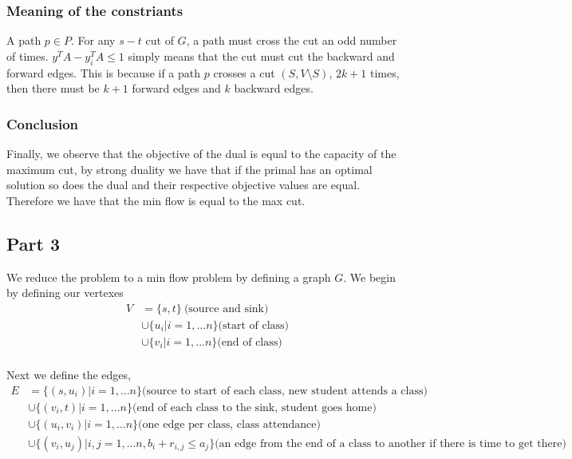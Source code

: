 \documentclass[a4paper]{article}
\begin{document}
 
\subsubsection*{Meaning of the constriants}
A path $p \in P$. For any $s-t$ cut of $G$, a path must cross the cut 
an odd number of times. $y^TA - y_i^TA \leq 1$ simply means that the cut must cut the 
backward and forward edges. This is because if a path $p$ crosses a cut $(S, V\setminus S)$,  $2k+1$ times, then 
there must be $k+1$ forward edges and $k$ backward edges. 

\subsubsection*{Conclusion}

Finally, we observe that the objective of the dual is equal to the capacity of the maximum cut, by 
strong duality we have that if the primal has an optimal solution so does the dual and their respective
objective values are equal. Therefore we have that the min flow is equal to the max cut.

\subsection{Part 3}

We reduce the problem to a min flow problem by defining a graph $G$. We begin by defining our 
vertexes 
\begin{align*}
	V &= \{s, t\}\ \text{(source and sink)} \\ 
	&\cup \{u_i | i=1,...n\} \text{(start of class)}\\
	&\cup \{v_i | i=1,...n\} \text{(end of class)}\\
\end{align*}

Next we define the edges, 
\begin{align*}
	E &= \{(s,u_i) | i=1,...n\} \text{(source to start of each class, new student attends a class)}\\
	  &\cup \{(v_i, t) | i=1,...n\}  \text{(end of each class to the sink, student goes home)}\\
	  &\cup \{(u_i, v_i) | i=1,...n\} \text{(one edge per class, class attendance)}\\
	  &\cup \{(v_i, u_j) | i,j=1,...n, b_i + r_{i,j} \leq a_j\} \text{(an edge from the end of a class to another if there is time to get there)}
\end{align*}
\end{document}
